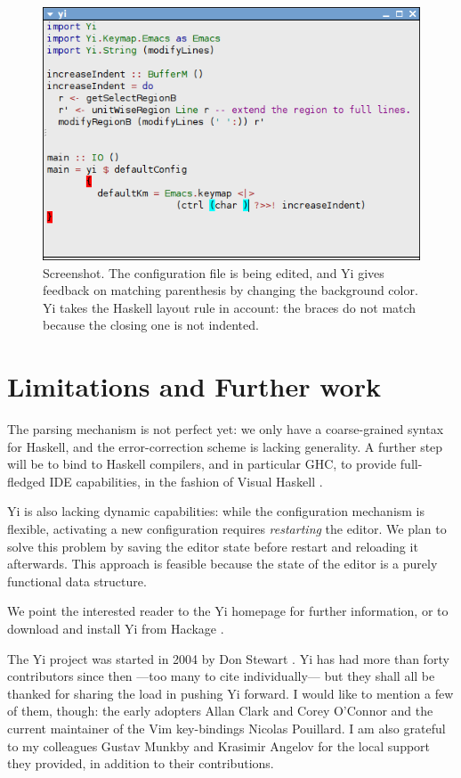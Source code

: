\documentclass[9pt,indentedstyle,preprint]{sigplanconf}
\begin{document}
\begin{figure}
\includegraphics[width=\columnwidth]{screenshot.png}
\caption{Screenshot. The configuration file is being edited, and Yi
  gives feedback on matching parenthesis by changing the background
  color. Yi takes the Haskell layout rule in account: the braces do
  not match because the closing one is not indented.}
\label{fig:screenshot}
\end{figure}

\section{Limitations and Further work}

The parsing mechanism is not perfect yet: we only have a coarse-grained
syntax for Haskell, and the error-correction scheme is lacking
generality.  A further step will be to bind to Haskell compilers, and
in particular GHC, to provide full-fledged IDE capabilities, in the
fashion of Visual Haskell \cite{Angelov2005VH}.

Yi is also lacking dynamic capabilities: while the configuration
mechanism is flexible, activating a new configuration requires {\em
  restarting} the editor.  We plan to solve this problem by saving the
editor state before restart and reloading it afterwards. This approach is
feasible because the state of the editor is a purely functional data
structure.

We point the interested reader to the Yi homepage \cite{YiHome} for
further information, or to download and install Yi from Hackage
\cite{Hackage}.

\acks 

The Yi project was started in 2004 by Don Stewart
\cite{Stewart2005Dynamic}. Yi has had more than forty contributors
since then ---too many to cite individually--- but
they shall all be thanked for sharing the load in pushing Yi
forward. I would like to mention a few of them, though: the early
adopters Allan Clark and Corey O'Connor and the current maintainer of
the Vim key-bindings Nicolas Pouillard. I am also grateful to my
colleagues Gustav Munkby and Krasimir Angelov for the local support
they provided, in addition to their contributions.
\end{document}
